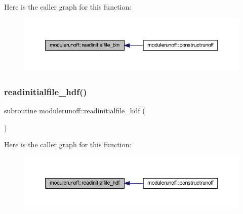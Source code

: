 Here is the caller graph for this function\+:
\nopagebreak
\begin{figure}[H]
\begin{center}
\leavevmode
\includegraphics[width=350pt]{namespacemodulerunoff_abc7533c7bdb5fde4b69ad3d1db1b0b1a_icgraph}
\end{center}
\end{figure}
\mbox{\label{namespacemodulerunoff_a0076542117101ad74013563790aca394}} 
\subsubsection{\texorpdfstring{readinitialfile\+\_\+hdf()}{readinitialfile\_hdf()}}
{\footnotesize\ttfamily subroutine modulerunoff\+::readinitialfile\+\_\+hdf (\begin{DoxyParamCaption}{ }\end{DoxyParamCaption})\hspace{0.3cm}{\ttfamily [private]}}

Here is the caller graph for this function\+:
\nopagebreak
\begin{figure}[H]
\begin{center}
\leavevmode
\includegraphics[width=350pt]{namespacemodulerunoff_a0076542117101ad74013563790aca394_icgraph}
\end{center}
\end{figure}
\mbox{\label{namespacemodulerunoff_a16bc6313240379de466a61574c8dbc1d}} 
